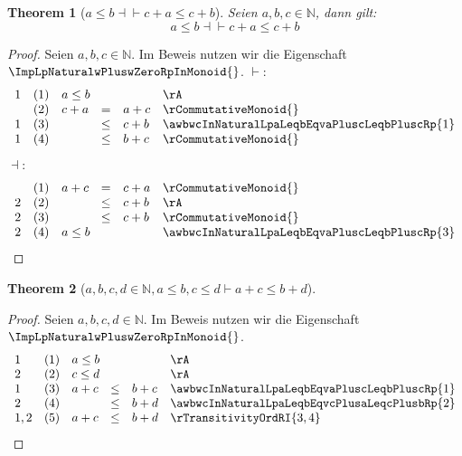 \documentclass{book}
\theoremstyle{plain}
\newtheorem{theorem}{Theorem}
\theoremstyle{remark}
\theoremstyle{definition}
\begin{document}
\label{awbwcInNaturalLpaLeqbEqvcPlusaLeqcPlusbRp}
\begin{theorem}[\(a\leq b\dashv\vdash c+a\leq c+b\)]
Seien \(a,b,c\in\mathbb{N}\), dann gilt:
\[a\leq b\dashv\vdash c+a\leq c+b\]
\end{theorem}
\begin{proof}
Seien \(a, b, c \in \mathbb{N}\). Im Beweis nutzen wir die Eigenschaft \(\ImpLpNaturalwPluswZeroRpInMonoid{}\).
\(\vdash\):
        \[
	\begin{array}{llclll}
            1     &  (1) & \multicolumn{3}{l}{a\leq b} & \rA \\
                  &  (2) & c+a&=&a+c & \rCommutativeMonoid{} \\
            1     &  (3) &    &\leq& c+b & \awbwcInNaturalLpaLeqbEqvaPluscLeqbPluscRp{1} \\
            1     &  (4) &    &\leq& b+c & \rCommutativeMonoid{} \\
    \end{array}
	\]
\(\dashv\):
        \[
	\begin{array}{llclll}
                  &  (1) & a+c&=&c+a & \rCommutativeMonoid{} \\
            2     &  (2) &    &\leq& c+b & \rA \\
            2     &  (3) &    &\leq& c+b & \rCommutativeMonoid{} \\
            2     &  (4) &   \multicolumn{3}{l}{a\leq b} & \awbwcInNaturalLpaLeqbEqvaPluscLeqbPluscRp{3} \\
        \end{array}
	\]
\end{proof}

\label{awbwcwdInNaturalwaLeqbwcLeqdImpaPluscLeqbPlusd}
\begin{theorem}[\(a,b,c,d\in\mathbb{N},a\leq b, c\leq d\vdash a+c\leq b+d\)]
\end{theorem}
\begin{proof}
Seien \(a, b, c, d \in \mathbb{N}\). Im Beweis nutzen wir die Eigenschaft \(\ImpLpNaturalwPluswZeroRpInMonoid{}\).
        \[
	\begin{array}{llclll}
            1     &  (1) & \multicolumn{3}{l}{a\leq b} & \rA \\
            2     &  (2) & \multicolumn{3}{l}{c\leq d} & \rA \\
            1     &  (3) & a+c&\leq &b+c & \awbwcInNaturalLpaLeqbEqvaPluscLeqbPluscRp{1} \\
            2     &  (4) &    &\leq &b+d & \awbwcInNaturalLpaLeqbEqvcPlusaLeqcPlusbRp{2} \\
            1,2   &  (5) & a+c&\leq &b+d & \rTransitivityOrdRI{3,4} \\
    \end{array}
	\]
\end{proof}
\end{document}
